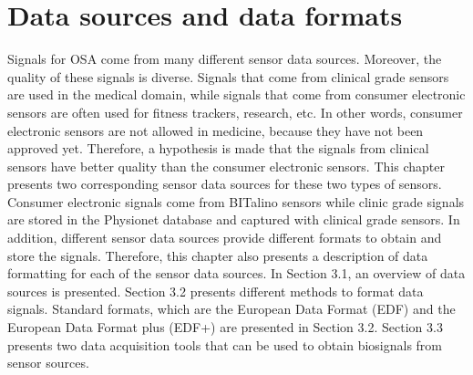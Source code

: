 
\chapter{Data sources and data formats} %

\label{Chapter3} %
Signals for OSA come from many different sensor data sources. Moreover, the quality of these signals is diverse. Signals that come from clinical grade sensors are used in the medical domain, while signals that come from consumer electronic sensors are often used for fitness trackers, research, etc. In other words, consumer electronic sensors are not allowed in medicine, because they have not been approved yet. Therefore, a hypothesis is made that the signals from clinical sensors have better quality than the consumer electronic sensors. This chapter presents two corresponding sensor data sources for these two types of sensors. Consumer electronic signals come from BITalino sensors while clinic grade signals are stored in the Physionet database and captured with clinical grade sensors. In addition, different sensor data sources provide different formats to obtain and store the signals. Therefore, this chapter also presents a description of data formatting for each of the sensor data sources. In Section 3.1, an overview of data sources is presented. Section 3.2 presents different methods to format data signals. Standard formats, which are the European Data Format (EDF)\citep{EDF1} and the European Data Format plus (EDF+) are presented in Section 3.2. Section 3.3 presents two data acquisition tools that can be used to obtain biosignals from sensor sources.
